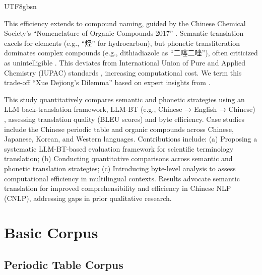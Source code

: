 \documentclass[conference]{IEEEtran}
\begin{document}
\begin{CJK*}{UTF8}{gbsn}

This efficiency extends to compound naming, guided by the Chinese Chemical Society’s “Nomenclature of Organic Compounds-2017” \citep{ccs2017nomenclature}. Semantic translation excels for elements (e.g., “烃” for hydrocarbon), but phonetic transliteration dominates complex compounds (e.g., dithiadiazole as “二噻二唑”), often criticized as unintelligible \citep{hejuan2019nomencl}. This deviates from International Union of Pure and Applied Chemistry (IUPAC) standards \citep{favre2014nomenclature}, increasing computational cost. We term this trade-off “Xue Dejiong’s Dilemma” based on expert insights from \citep{hejuan2019nomencl}.

This study quantitatively compares semantic and phonetic strategies using an LLM back-translation framework, LLM-BT (e.g., Chinese → English → Chinese) \citep{hoang2018iterative}, assessing translation quality (BLEU scores) and byte efficiency. Case studies include the Chinese periodic table and organic compounds across Chinese, Japanese, Korean, and Western languages. Contributions include: (a) Proposing a systematic LLM-BT-based evaluation framework for scientific terminology translation; (b) Conducting quantitative comparisons across semantic and phonetic translation strategies; (c) Introducing byte-level analysis to assess computational efficiency in multilingual contexts. Results advocate semantic translation for improved comprehensibility and efficiency in Chinese NLP (CNLP), addressing gaps in prior qualitative research.

\section{Basic Corpus}

\subsection{Periodic Table Corpus}


\end{CJK*}
\end{document}

